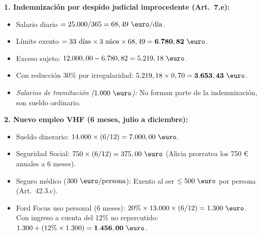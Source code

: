 \documentclass[11pt,a4paper,openany]{article}
\begin{document}
\begin{solucionBox}
\textbf{1. Indemnización por despido judicial improcedente (Art.~7.e):}
\begin{itemize}
    \item Salario diario $= 25.000 / 365 = 68,49\text{ \euro/día}$.
    \item Límite exento $= 33\text{ días} \times 3\text{ años} \times 68,49 = \mathbf{6.780,82\text{ \euro}}$.
    \item Exceso sujeto: $12.000,00 - 6.780,82 = 5.219,18\text{ \euro}$.
    \item Con reducción 30\% por irregularidad: $5.219,18 \times 0,70 = \mathbf{3.653,43\text{ \euro}}$.
    \item \textit{Salarios de tramitación ($1.000\text{ \euro}$):} No forman parte de la indemnización, son sueldo ordinario.
\end{itemize}

\textbf{2. Nuevo empleo VHF (6 meses, julio a diciembre):}
\begin{itemize}
    \item Sueldo dinerario: $14.000 \times (6/12) = 7.000,00\text{ \euro}$.
    \item Seguridad Social: $750 \times (6/12) = 375,00\text{ \euro}$ (Alicia prorratea los 750 € anuales a 6 meses).
    \item Seguro médico ($300\text{ \euro/persona}$): Exento al ser $\le 500\text{ \euro}$ por persona (Art.~42.3.c).
    \item Ford Focus uso personal (6 meses): $20\% \times 13.000 \times (6/12) = 1.300\text{ \euro}$.
    Con ingreso a cuenta del 12\% no repercutido: $1.300 + (12\% \times 1.300) = \mathbf{1.456,00\text{ \euro}}$.
\end{itemize}


\end{solucionBox}
\end{document}
